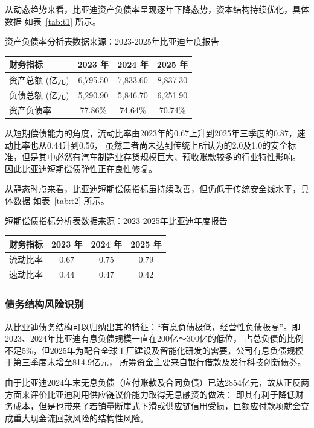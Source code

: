 \documentclass[12pt,a4paper,fontset=windows,UTF8]{ctexart}
\begin{document}
从动态趋势来看，比亚迪资产负债率呈现逐年下降态势，资本结构持续优化，具体数据 如表~\ref{tab:t1} 所示。

\begin{thesTab}[htbp]{资产负债率分析表\label{tab:t1}}{数据来源：2023-2025年比亚迪年度报告}
\begin{tabularx}{0.86\linewidth}{X c c c}
  \toprule
  财务指标 & 2023 年 & 2024 年 & 2025 年 \\
  \midrule
  资产总额 (亿元) & 6,795.50 & 7,833.60 & 8,837.30 \\
  负债总额 (亿元) & 5,290.90 & 5,846.70 & 6,251.90 \\
  资产负债率 & 77.86\% & 74.64\% & 70.74\% \\
  \bottomrule
\end{tabularx}
\end{thesTab}

从短期偿债能力的角度，流动比率由2023年的0.67上升到2025年三季度的0.87，速动比率也从0.44升到0.56，
  虽然二者尚未达到传统上所认为的2.0及1.0的安全标准，但是其中必然有汽车制造业存货规模巨大、预收账款较多的行业特性影响。
  因此比亚迪短期偿债弹性正在良性修复。

从静态时点来看，比亚迪短期偿债指标虽持续改善，但仍低于传统安全线水平，具体数据 如表~\ref{tab:t2} 所示。

\begin{thesTab}[htbp]{短期偿债指标分析表\label{tab:t2}}{数据来源：2023-2025年比亚迪年度报告}
\begin{tabularx}{0.86\linewidth}{X c c c}
  \toprule
  财务指标 & 2023 年 & 2024 年 & 2025 年 \\
  \midrule
  流动比率 & 0.67 & 0.75 & 0.79 \\
  速动比率 & 0.44 & 0.47 & 0.42 \\
  \bottomrule
\end{tabularx}
\end{thesTab}

\subsubsection{债务结构风险识别}

从比亚迪债务结构可以归纳出其的特征：“有息负债极低，经营性负债极高”。即2023、2024年比亚迪有息负债规模一直在200亿～300亿的低位，
  占总负债的比例不足5\%，但2025年为配合全球工厂建设及智能化研发的需要，公司有息负债规模于第三季度末增至814.9亿元，
  所筹资金主要来自银行借款及发行科技创新债券。

由于比亚迪2024年末无息负债（应付账款及合同负债）已达2854亿元，故从正反两方面来评价比亚迪利用供应链议价能力取得无息融资的做法：
  即其有利于降低财务成本，但是也带来了若销量断崖式下滑或供应链信用受损，巨额应付款项就会变成重大现金流回款风险的结构性风险。
\end{document}
